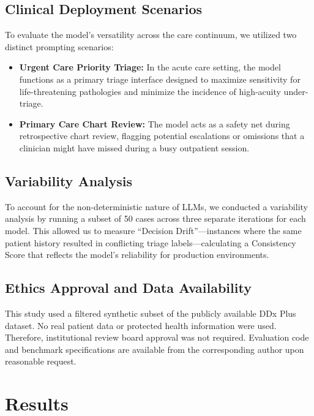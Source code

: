 \documentclass[11pt,a4paper]{article}
\begin{document}
\subsection{Clinical Deployment Scenarios}

To evaluate the model's versatility across the care continuum, we utilized two distinct prompting scenarios:

\begin{itemize}
  \item \textbf{Urgent Care Priority Triage:} In the acute care setting, the model functions as a primary triage interface designed to maximize sensitivity for life-threatening pathologies and minimize the incidence of high-acuity under-triage.
  \item \textbf{Primary Care Chart Review:} The model acts as a safety net during retrospective chart review, flagging potential escalations or omissions that a clinician might have missed during a busy outpatient session.
\end{itemize}

\subsection{Variability Analysis}

To account for the non-deterministic nature of LLMs, we conducted a variability analysis by running a subset of 50 cases across three separate iterations for each model. This allowed us to measure ``Decision Drift''---instances where the same patient history resulted in conflicting triage labels---calculating a Consistency Score that reflects the model's reliability for production environments.

\subsection{Ethics Approval and Data Availability}

This study used a filtered synthetic subset of the publicly available DDx Plus dataset. No real patient data or protected health information were used. Therefore, institutional review board approval was not required. Evaluation code and benchmark specifications are available from the corresponding author upon reasonable request.

\section{Results}
\end{document}
